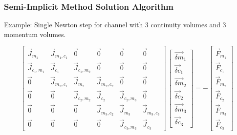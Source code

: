 \documentclass[compress,xcolor=table]{beamer}
\begin{document}
\begin{frame}
\frametitle{Semi-Implicit Method Solution Algorithm}

Example: Single Newton step for channel with 3 continuity volumes and 3 momentum volumes.

\begin{equation*}
\label{eqn:si_solve}
\begin{bmatrix} 
\vec{J}_{m_1} & \vec{J}_{m_1,c_1} & \vec{0} & \vec{0} & \vec{0} & \vec{0}\\
\vec{J}_{c_1,m_1} & \vec{J}_{c_1} & \vec{J}_{c_1,m_2} & \vec{0} & \vec{0} & \vec{0} \\
\vec{0} & \vec{J}_{m_2,c_1} & \vec{J}_{m_2} & \vec{J}_{m_2,c_2} & \vec{0} & \vec{0} \\
\vec{0} & \vec{0} & \vec{J}_{c_2,m_2} & \vec{J}_{c_2} & \vec{J}_{c_2,m_3} & \vec{0} \\
\vec{0} & \vec{0} & \vec{0} & \vec{J}_{m_3,c_2} & \vec{J}_{m_3} & \vec{J}_{m_3,c_3} \\ 
\vec{0} & \vec{0} & \vec{0} & \vec{0} & \vec{J}_{c_3,m_3} & \vec{J}_{c_3}  
\end{bmatrix} \begin{bmatrix}
\vec{\delta m}_{1} \\ \vec{\delta c}_{1} \\
\vec{\delta m}_{2} \\ \vec{\delta c}_{2} \\
\vec{\delta m}_{3} \\ \vec{\delta c}_{3}
\end{bmatrix}  = -\begin{bmatrix}
\vec{F}_{m_1} \\ \vec{F}_{c_1} \\
\vec{F}_{m_2} \\ \vec{F}_{c_2} \\
\vec{F}_{m_3} \\ \vec{F}_{c_3} \end{bmatrix}
\end{equation*}

\end{frame}
\end{document}
